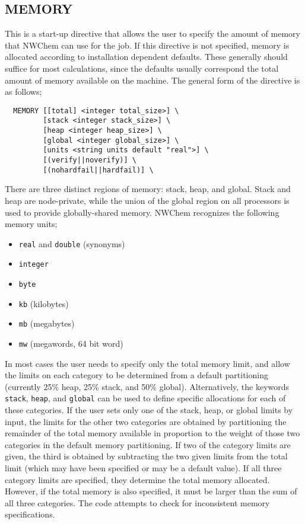 \subsection{MEMORY}

This is a start-up directive that allows the user to specify the
amount of memory that NWChem can use for the job.  If this directive
is not specified, memory is allocated according to installation
dependent defaults.  These generally should suffice for most
calculations, since the defaults usually correspond the total amount
of memory available on the machine.  The general form of the directive
is as follows;

\begin{verbatim}
  MEMORY [[total] <integer total_size>] \
         [stack <integer stack_size>] \
         [heap <integer heap_size>] \
         [global <integer global_size>] \
         [units <string units default "real">] \
         [(verify||noverify)] \
         [(nohardfail||hardfail)] \
\end{verbatim}

There are three distinct regions of memory: stack, heap, and global.
Stack and heap are node-private, while the union of the global region
on all processors is used to provide globally-shared memory.  NWChem
recognizes the following memory units;
\begin{itemize}
\item \verb+real+ and \verb+double+ (synonyms)
\item \verb+integer+
\item \verb+byte+
\item \verb+kb+ (kilobytes)
\item \verb+mb+ (megabytes)
\item \verb+mw+ (megawords, 64 bit word)
\end{itemize}

In most cases the user needs to specify only the total memory limit,
and allow the limits on each category to be determined from a default
partitioning (currently 25\% heap, 25\% stack, and 50\% global).
Alternatively, the keywords \verb+stack+, \verb+heap+, and
\verb+global+ can be used to define specific allocations for each of
these categories.  If the user sets only one of the stack, heap, or
global limits by input, the limits for the other two categories are
obtained by partitioning the remainder of the total memory available
in proportion to the weight of those two categories in the default
memory partitioning.  If two of the category limits are given, the
third is obtained by subtracting the two given limits from the total
limit (which may have been specified or may be a default value).  If
all three category limits are specified, they determine the total
memory allocated.  However, if the total memory is also specified, it
must be larger than the sum of all three categories.  The code
attempts to check for inconsistent memory specifications.

